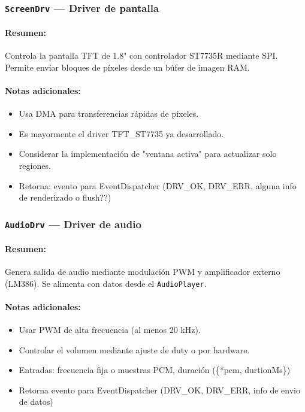 \documentclass[11pt,a4paper]{article}
\begin{document}
\subsubsection{\texttt{ScreenDrv} — Driver de pantalla}
\paragraph{Resumen:} Controla la pantalla TFT de 1.8" con controlador ST7735R mediante SPI. Permite enviar bloques de píxeles desde un búfer de imagen RAM.
\paragraph{Notas adicionales:}
\begin{itemize}
  \item Usa DMA para transferencias rápidas de píxeles.
  \item Es mayormente el driver TFT\_ST7735 ya desarrollado.
  \item Considerar la implementación de "ventana activa" para actualizar solo regiones.
  \item Retorna: evento para EventDispatcher  (DRV\_OK, DRV\_ERR, alguna info de renderizado o flush??)
\end{itemize}

\subsubsection{\texttt{AudioDrv} — Driver de audio}
\paragraph{Resumen:} Genera salida de audio mediante modulación PWM y amplificador externo (LM386). Se alimenta con datos desde el \texttt{AudioPlayer}.
\paragraph{Notas adicionales:}
\begin{itemize}
  \item Usar PWM de alta frecuencia (al menos 20 kHz). %
  \item Controlar el volumen mediante ajuste de duty o por hardware.
  \item Entradas: frecuencia fija o muestras PCM, duración (\{*pcm, durtionMs\})
  \item Retorna evento para EventDispatcher  (DRV\_OK, DRV\_ERR, info de envio de datos)
\end{itemize}
\end{document}
